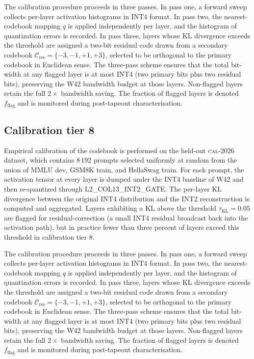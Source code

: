 The calibration procedure proceeds in three passes. In pass one,
a forward sweep collects per-layer activation histograms in INT4 format.
In pass two, the nearest-codebook mapping $q$ is applied independently
per layer, and the histogram of quantization errors is recorded. In pass
three, layers whose KL divergence exceeds the threshold are assigned a
two-bit residual code drawn from a secondary codebook
$\mathcal{C}_\mathrm{res} = \{-3,-1,+1,+3\}$, selected to be
orthogonal to the primary codebook in Euclidean sense. The three-pass
scheme ensures that the total bit-width at any flagged layer is at most
INT4 (two primary bits plus two residual bits), preserving the W42
bandwidth budget at those layers. Non-flagged layers retain the full
$2\times$ bandwidth saving. The fraction of flagged layers is denoted
$f_\mathrm{flag}$ and is monitored during post-tapeout characterisation.


\subsection{Calibration tier 8}

Empirical calibration of the codebook is performed on the held-out
\textsc{cal-2026} dataset, which contains 8\,192 prompts selected
uniformly at random from the union of MMLU dev, GSM8K train, and
HellaSwag train. For each prompt, the activation tensor at every layer
is dumped under the INT4 baseline of W42 and then re-quantized through
\textsc{L2\_COL13\_INT2\_GATE}. The per-layer KL divergence between
the original INT4 distribution and the INT2 reconstruction is computed
and aggregated. Layers exhibiting a KL above the threshold
$\tau_{\mathrm{KL}} = 0.05$ are flagged for residual-correction (a
small INT4 residual broadcast back into the activation path), but in
practice fewer than three percent of layers exceed this threshold in
calibration tier 8.

The calibration procedure proceeds in three passes. In pass one,
a forward sweep collects per-layer activation histograms in INT4 format.
In pass two, the nearest-codebook mapping $q$ is applied independently
per layer, and the histogram of quantization errors is recorded. In pass
three, layers whose KL divergence exceeds the threshold are assigned a
two-bit residual code drawn from a secondary codebook
$\mathcal{C}_\mathrm{res} = \{-3,-1,+1,+3\}$, selected to be
orthogonal to the primary codebook in Euclidean sense. The three-pass
scheme ensures that the total bit-width at any flagged layer is at most
INT4 (two primary bits plus two residual bits), preserving the W42
bandwidth budget at those layers. Non-flagged layers retain the full
$2\times$ bandwidth saving. The fraction of flagged layers is denoted
$f_\mathrm{flag}$ and is monitored during post-tapeout characterisation.


